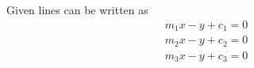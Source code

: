 %
%
    Given lines can be written as \begin{align}
       m_1x-y+c_1=0
    \end{align}
    \begin{align}
        m_2x-y+c_2=0
    \end{align}
    \begin{align}
        m_3x-y+c_3=0
        \label{eq:line3}
    \end{align}
    
